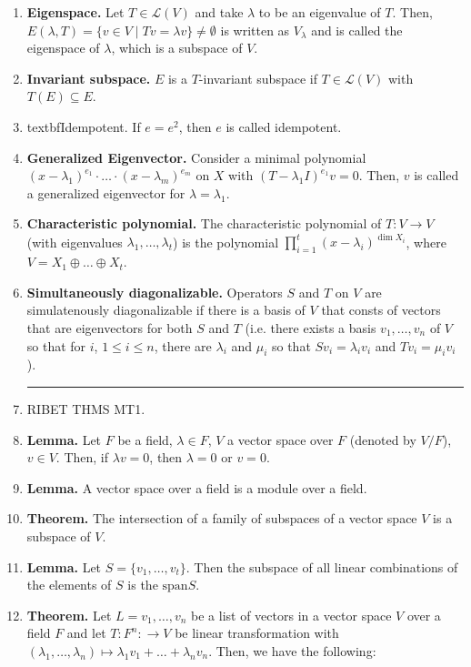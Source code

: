 \begin{enumerate}
	\item \textbf{Eigenspace. } Let $T \in \mathscr{L}(V)$ and take $\lambda$ to be an eigenvalue of $T$. Then, $E(\lambda,T) = \{v \in V \mid Tv = \lambda v\} \neq \emptyset$ is written as $V_\lambda$ and is called the eigenspace of $\lambda$, which is a subspace of $V$. 
	\item \textbf{Invariant subspace. } $E$ is a $T$-invariant subspace if $T \in \mathscr{L}(V)$ with $T(E) \subseteq E$. 
	\item textbf{Idempotent. } If $e = e^2$, then $e$ is called idempotent. 
	\item \textbf{Generalized Eigenvector. } Consider a minimal polynomial $(x-\lambda_1)^{e_1} \cdot \dots \cdot (x-\lambda_m)^{e_m}$ on $X$ with $(T-\lambda_1I)^{e_1}v = 0$. Then, $v$ is called a generalized eigenvector for $\lambda = \lambda_1$. 
	\item \textbf{Characteristic polynomial. } The characteristic polynomial of $T: V \to V$ (with eigenvalues $\lambda_1,\dots,\lambda_t$) is the polynomial $\prod_{i=1}^{t} (x-\lambda_i)^{\dim X_i}$, where $V = X_1 \oplus \dots \oplus X_t$. 
	\item \textbf{Simultaneously diagonalizable. } Operators $S$ and $T$ on $V$ are simulatenously diagonalizable if there is a basis of $V$ that consts of vectors that are eigenvectors for both $S$ and $T$ (i.e. there exists a basis $v_1,\dots,v_n$ of $V$ so that for $i$, $1 \leq i \leq n$, there are $\lambda_i$ and $\mu_i$ so that $Sv_i = \lambda_iv_i$ and $Tv_i = \mu_iv_i$). 
	\begin{center}
		\hrule
	\end{center} 
	\item RIBET THMS MT1. 
	\item \textbf{Lemma. } Let $F$ be a field, $\lambda \in F$, $V$ a vector space over $F$ (denoted by $V/F$), $v \in V$. Then, if $\lambda v = 0$, then $\lambda=0$ or $v=0$. 
    \item \textbf{Lemma. } A vector space over a field is a module over a field. 
    \item \textbf{Theorem. } The intersection of a family of subspaces of a vector space $V$ is a subspace of $V$. 
    \item \textbf{Lemma. } Let $S=\{v_1,\dots,v_t\}$. Then the subspace of all linear combinations of the elements of $S$ is the $\mathrm{span}S$. 
    \item \textbf{Theorem. } Let $L=v_1,\dots,v_n$ be a list of vectors in a vector space $V$ over a field $F$ and let $T: F^n: \to V$ be linear transformation with $(\lambda_1,\dots,\lambda_n) \mapsto \lambda_1v_1 + \dots + \lambda_nv_n$. Then, we have the following: 

\end{enumerate}
